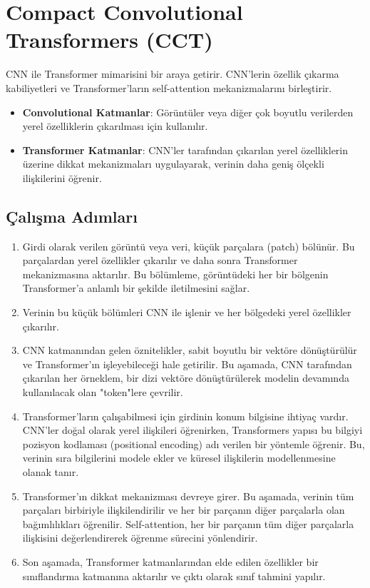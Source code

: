 \section{Compact Convolutional Transformers (CCT)}

CNN ile Transformer mimarisini bir araya getirir. CNN'lerin özellik çıkarma kabiliyetleri ve Transformer'ların self-attention mekanizmalarını birleştirir. 

\begin{itemize}
    \item \textbf{Convolutional Katmanlar}: Görüntüler veya diğer çok boyutlu verilerden yerel özelliklerin çıkarılması için kullanılır.
    \item \textbf{Transformer Katmanlar}: CNN'ler tarafından çıkarılan yerel özelliklerin üzerine dikkat mekanizmaları uygulayarak, verinin daha geniş ölçekli ilişkilerini öğrenir.
\end{itemize}


\subsection{Çalışma Adımları}

\begin{enumerate}
    \item Girdi olarak verilen görüntü veya veri, küçük parçalara (patch) bölünür. Bu parçalardan yerel özellikler çıkarılır ve daha sonra Transformer mekanizmasına aktarılır. Bu bölümleme, görüntüdeki her bir bölgenin Transformer’a anlamlı bir şekilde iletilmesini sağlar.
    \item Verinin bu küçük bölümleri CNN ile işlenir ve her bölgedeki yerel özellikler çıkarılır.
    \item CNN katmanından gelen öznitelikler, sabit boyutlu bir vektöre dönüştürülür ve Transformer’ın işleyebileceği hale getirilir. Bu aşamada, CNN tarafından çıkarılan her örneklem, bir dizi vektöre dönüştürülerek modelin devamında kullanılacak olan "token"lere çevrilir.
    \item Transformer’ların çalışabilmesi için girdinin konum bilgisine ihtiyaç vardır. CNN'ler doğal olarak yerel ilişkileri öğrenirken, Transformers yapısı bu bilgiyi pozisyon kodlaması (positional encoding) adı verilen bir yöntemle öğrenir. Bu, verinin sıra bilgilerini modele ekler ve küresel ilişkilerin modellenmesine olanak tanır.
    \item Transformer'ın dikkat mekanizması devreye girer. Bu aşamada, verinin tüm parçaları birbiriyle ilişkilendirilir ve her bir parçanın diğer parçalarla olan bağımlılıkları öğrenilir. Self-attention, her bir parçanın tüm diğer parçalarla ilişkisini değerlendirerek öğrenme sürecini yönlendirir.
    \item Son aşamada, Transformer katmanlarından elde edilen özellikler bir sınıflandırma katmanına aktarılır ve çıktı olarak sınıf tahmini yapılır.
\end{enumerate}

\newpage